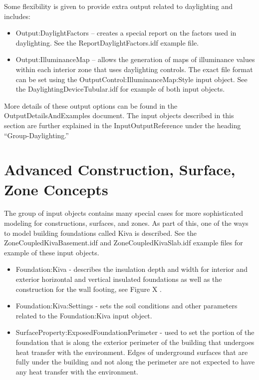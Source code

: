 Some flexibility is given to provide extra output related to daylighting
and includes:
\begin{itemize}
\item Output:DaylightFactors -- creates a special report on the factors
used in daylighting. See the ReportDaylightFactors.idf example file.
\item Output:IlluminanceMap -- allows the generation of maps of illuminance
values within each interior zone that uses daylighting controls. The
exact file format can be set using the OutputControl:IlluminanceMap:Style
input object. See the DaylightingDeviceTubular.idf for example of
both input objects.
\end{itemize}
More details of these output options can be found in the OutputDetailsAndExamples
document. The input objects described in this section are further
explained in the InputOutputReference under the heading ``Group-Daylighting.''

\section{Advanced Construction, Surface, Zone Concepts}

The group of input objects contains many special cases for more sophisticated
modeling for constructions, surfaces, and zones. As part of this,
one of the ways to model building foundations called Kiva is described.
See the ZoneCoupledKivaBasement.idf and ZoneCoupledKivaSlab.idf example
files for example of these input objects.
\begin{itemize}
\item Foundation:Kiva - describes the insulation depth and width for interior
and exterior horizontal and vertical insulated foundations as well
as the construction for the wall footing, see Figure X .
\item Foundation:Kiva:Settings - sets the soil conditions and other parameters
related to the Foundation:Kiva input object.
\item SurfaceProperty:ExposedFoundationPerimeter - used to set the portion
of the foundation that is along the exterior perimeter of the building
that undergoes heat transfer with the environment. Edges of underground
surfaces that are fully under the building and not along the perimeter
are not expected to have any heat transfer with the environment.
\end{itemize}

